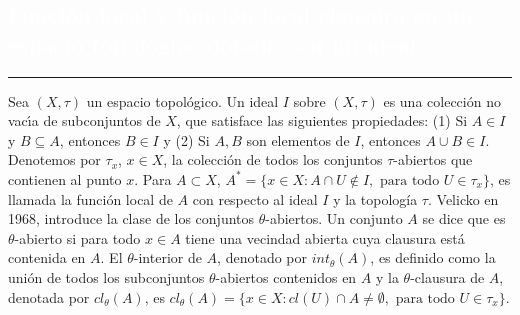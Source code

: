 \begin{titlepage}
\pagecolor{white}
\BgThispage
{}
\vspace*{-1.1cm}
\noindent
\def\titulo#1{\section{#1}}
\section{\bf\large\textcolor{white}{Funci\'{o}n local y funci\'{o}n local clausura en un espacio topol\'{o}gico dotado con un ideal}}
\vspace*{2cm}\par
\noindent

\begin{minipage}{0.5\linewidth}
\begin{minipage}{0.45\linewidth}
    \begin{flushright}
        \printauthor
    \end{flushright}
\end{minipage} \hspace{0pt}
%
\begin{minipage}{0.02\linewidth}
      \color{ptctitle} \rule{1pt}{175pt}
\end{minipage} 
\end{minipage}
\hspace*{-4.5cm}
%
\begin{minipage}{0.85\linewidth}
\begin{minipage}{0.85\linewidth}
\footnotesize
\vspace{5pt}
    \begin{resumen} 
Sea $(X,\tau)$ un espacio topol\'{o}gico. Un ideal $I$ sobre $(X,\tau)$ es una colecci\'{o}n no vac\'{\i}a de subconjuntos de $X$, que satisface las siguientes propiedades: (1) Si $A\in I$ y $B\subseteq A$, entonces $B\in I$ y (2) Si $A,B$ son elementos de $I$, entonces $A\cup B\in I$. Denotemos por $\tau_x$, $x\in X$, la colecci\'{o}n de todos los conjuntos $\tau$-abiertos que contienen al punto $x$. Para $A\subset X$, $A^{*}=\{x\in X: A\cap U\notin I,\mbox{ para todo } U\in \tau_{x}\}$,
es llamada la funci\'{o}n local de $A$ con respecto al ideal $I$  y la topolog\'{i}a $\tau$. Velicko en 1968, introduce la clase de los conjuntos $\theta$-abiertos. Un conjunto $A$ se dice que es $\theta$-abierto si para todo $x\in A$ tiene una vecindad abierta cuya clausura est\'{a} contenida en $A$. El $\theta$-interior de $A$, denotado por $int_{\theta}(A)$, es definido como la uni\'{o}n de todos los subconjuntos $\theta$-abiertos contenidos en $A$ y la $\theta$-clausura de $A$, denotada por $cl_{\theta}(A)$, es $cl_{\theta}(A)=\{x\in X: cl(U)\cap A\neq\emptyset, \mbox{ para todo } U\in \tau_{x}\}$.

\end{resumen}
\end{minipage}
\end{minipage}
\end{titlepage}
